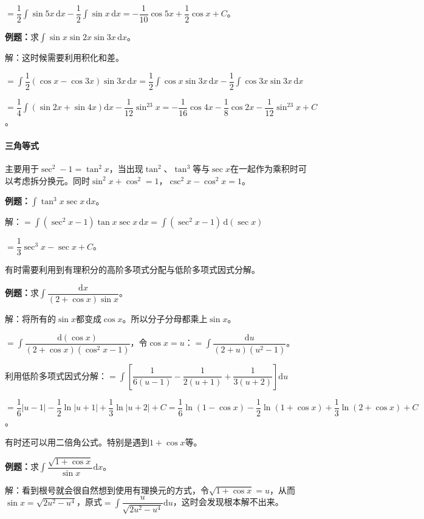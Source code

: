 \documentclass[UTF8, 12pt]{ctexart}
\begin{document}
$=\dfrac{1}{2}\int\sin5x\,\textrm{d}x-\dfrac{1}{2}\int\sin x\,\textrm{d}x=-\dfrac{1}{10}\cos5x+\dfrac{1}{2}\cos x+C$。

\textbf{例题：}求$\int\sin x\sin2x\sin3x\,\textrm{d}x$。

解：这时候需要利用积化和差。

$=\displaystyle{\int\dfrac{1}{2}(\cos x-\cos3x)\sin3x\,\textrm{d}x=\dfrac{1}{2}\int\cos x\sin3x\,\textrm{d}x-\dfrac{1}{2}\int\cos3x\sin3x\,\textrm{d}x}$

$=\dfrac{1}{4}\int(\sin2x+\sin4x)\textrm{d}x-\dfrac{1}{12}\sin^23x=-\dfrac{1}{16}\cos4x-\dfrac{1}{8}\cos2x-\dfrac{1}{12}\sin^23x+C$。

\paragraph{三角等式} \leavevmode \medskip

主要用于$\sec^2-1=\tan^2x$，当出现$\tan^2$、$\tan^3$等与$\sec x$在一起作为乘积时可以考虑拆分换元。同时$\sin^2x+\cos^2=1$，$\csc^2x-\cos^2x=1$。

\textbf{例题：}$\displaystyle{\int\tan^3x\sec x\,\textrm{d}x}$。

解：$=\displaystyle{\int(\sec^2x-1)}\tan x\sec x\,\textrm{d}x=\displaystyle{\int(\sec^2x-1)}\,\textrm{d}(\sec x)$

$=\dfrac{1}{3}\sec^3x-\sec x+C$。

有时需要利用到有理积分的高阶多项式分配与低阶多项式因式分解。

\textbf{例题：}求$\displaystyle{\int\dfrac{\textrm{d}x}{(2+\cos x)\sin x}}$。\medskip

解：将所有的$\sin x$都变成$\cos x$。所以分子分母都乘上$\sin x$。

$=\displaystyle{\int\dfrac{\textrm{d}(\cos x)}{(2+\cos x)(\cos^2x-1)}}$，令$\cos x=u$：$=\displaystyle{\int\dfrac{\textrm{d}u}{(2+u)(u^2-1)}}$。

利用低阶多项式因式分解：$=\displaystyle{\int\left[\dfrac{1}{6(u-1)}-\dfrac{1}{2(u+1)}+\dfrac{1}{3(u+2)}\right]\textrm{d}u}$

$=\dfrac{1}{6}\vert u-1\vert-\dfrac{1}{2}\ln\vert u+1\vert+\dfrac{1}{3}\ln\vert u+2\vert+C=\dfrac{1}{6}\ln(1-\cos x)-\dfrac{1}{2}\ln(1+\cos x)+\dfrac{1}{3}\ln(2+\cos x)+C$。

有时还可以用二倍角公式。特别是遇到$1+\cos x$等。\medskip

\textbf{例题：}求$\displaystyle{\int\dfrac{\sqrt{1+\cos x}}{\sin x}\textrm{d}x}$。

解：看到根号就会很自然想到使用有理换元的方式，令$\sqrt{1+\cos x}=u$，从而$\sin x=\sqrt{2u^2-u^4}$，原式$=\displaystyle{\int\dfrac{u}{\sqrt{2u^2-u^4}}\textrm{d}u}$，这时会发现根本解不出来。
\end{document}
